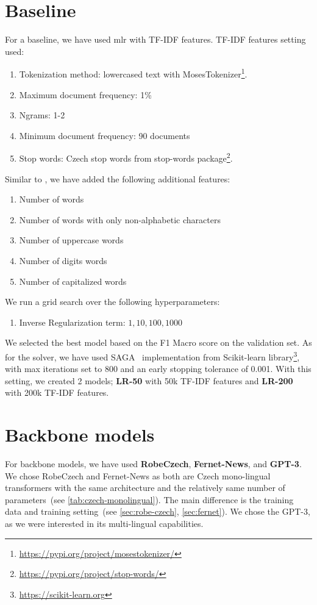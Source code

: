 \section{Baseline}
For a baseline, we have used \ac{mlr} with TF-IDF features.
TF-IDF features setting used:
\begin{enumerate}
    \item Tokenization method: lowercased text with MosesTokenizer\footnote{\url{https://pypi.org/project/mosestokenizer/}}.
    \item Maximum document frequency: 1\%
    \item Ngrams: 1-2
    \item Minimum document frequency: 90 documents
    \item Stop words: Czech stop words from stop-words package\footnote{\url{https://pypi.org/project/stop-words/}}.
\end{enumerate}
Similar to \textcite{strakaSumeCzechLargeCzech2018a}, we have added the following additional features:
\begin{enumerate}
    \item Number of words
    \item Number of words with only non-alphabetic characters
    \item Number of uppercase words
    \item Number of digits words
    \item Number of capitalized words
\end{enumerate}
We run a grid search over the following hyperparameters:
\begin{enumerate}
    \item Inverse Regularization term: $1, 10, 100, 1000$
\end{enumerate}
We selected the best model based on the F1 Macro score on the validation set.
As for the solver, we have used SAGA~\parencite{defazioSAGAFastIncremental2014}
implementation from Scikit-learn library\footnote{\url{https://scikit-learn.org}},
with max iterations set to 800 and an early stopping tolerance of 0.001.
With this setting, we created 2 models; \textbf{LR-50} with 50k TF-IDF features
and \textbf{LR-200} with 200k TF-IDF features.

\section{Backbone models}
\label{sec:backbone}
For backbone models, we have used \textbf{RobeCzech}, \textbf{Fernet-News},
and \textbf{GPT-3}. We chose RobeCzech and Fernet-News as both are Czech mono-lingual transformers
with the same architecture and the relatively same number of parameters~(see \autoref{tab:czech-monolingual}).
The main difference is the training data and training setting~(see \autoref{sec:robe-czech}, \autoref{sec:fernet}). We chose the
GPT-3, as we were interested in its multi-lingual capabilities.

